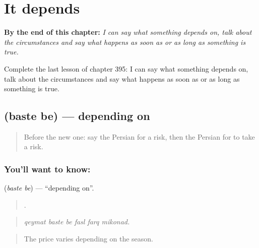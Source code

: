 
\chapter{It depends}
\label{ch:fa-it-depends}

\begin{chapteropening}
\textbf{By the end of this chapter:} \emph{I can say what something depends on, talk about the circumstances and say what happens as soon as or as long as something is true.}

Complete the last lesson of chapter 395: I can say what something depends on, talk about the circumstances and say what happens as soon as or as long as something is true.
\end{chapteropening}

\section[\texorpdfstring{\fa{بسته} \fa{به} (baste be)}{بسته به (baste be)}]{  (baste be) — depending on}

\label{lesson:FA-C395-baste-be}



\begin{quote}
Before the new one: say the Persian for a risk, then the Persian for to take a risk.
\end{quote}

\subsection*{You'll want to know:  }
\textbf{ } (\emph{baste be}) — \textquotedblleft{}depending on\textquotedblright{}.

\begin{quote}
     .
\end{quote}

\begin{quote}
\emph{qeymat baste be fasl farq mikonad.}
\end{quote}

\begin{quote}
The price varies depending on the season.
\end{quote}

